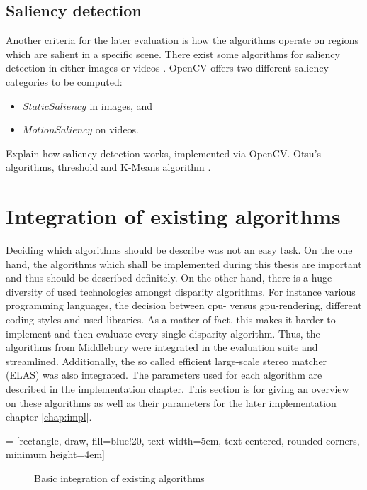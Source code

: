 \subsection*{Saliency detection}

Another criteria for the later evaluation is how the algorithms operate on regions which are salient in a specific scene.
There exist some algorithms for saliency detection in either images or videos \citep{dittrich2013saliency, opencv_library}.
OpenCV offers two different saliency categories to be computed:
\begin{itemize}
  \item $StaticSaliency$ in images, and
  \item $MotionSaliency$ on videos.
\end{itemize}

\noindent Explain how saliency detection works, implemented via OpenCV. Otsu's algorithms, threshold and K-Means algorithm \citep{hou2007saliency}.

\section{Integration of existing algorithms}

Deciding which algorithms should be describe was not an easy task.
On the one hand, the algorithms which shall be implemented during this thesis are important and thus should be described definitely.
On the other hand, there is a huge diversity of used technologies amongst disparity algorithms.
For instance various programming languages, the decision between cpu- versus gpu-rendering, different coding styles and used libraries.
As a matter of fact, this makes it harder to implement and then evaluate every single disparity algorithm.
Thus, the algorithms from Middlebury were integrated in the evaluation suite and streamlined.
Additionally, the so called efficient large-scale stereo matcher (ELAS) was also integrated.
The parameters used for each algorithm are described in the implementation chapter.
This section is for giving an overview on these algorithms as well as their parameters for the later implementation chapter \ref{chap:impl}.

 = [rectangle, draw, fill=blue!20,
    text width=5em, text centered, rounded corners, minimum height=4em]

\begin{figure}[h]
  \centering
  \caption{Basic integration of existing algorithms}
  \label{fig:integration}
\end{figure}

